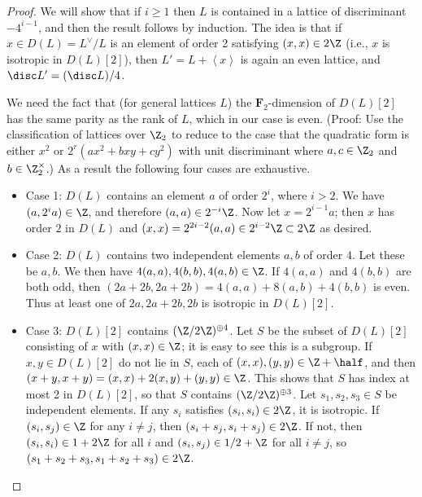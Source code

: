 \documentclass{article}
\def\F{\mathbf{F}}
\newcommand{\class}[1]{\left< #1 \right>}
\begin{document}
\begin{proof} We will show that if $i\geq 1$ then $L$ is contained in a lattice of discriminant $-4^{i-1}$, and then the result follows by induction. The idea is that if $x\in D(L)=L^\vee/L$ is an element of order 2 satisfying $(x,x)\in 2\Z$ (i.e., $x$ is isotropic in $D(L)[2]$), then $L'=L+\class{x}$ is again an even lattice, and $\disc L'=(\disc L)/4$. 

We need the fact that (for general lattices $L$) the $\F_2$-dimension of $D(L)[2]$ has the same parity as the rank of $L$, which in our case is even.  (Proof:  Use the classification of lattices over $\Z_2$ to reduce to the case that the quadratic form is either $x^2$ or $2^r(ax^2+bxy+cy^2)$ with unit discriminant where $a,c\in\Z_2$ and $b\in\Z_2^\times$.)   As a result the following four cases are exhaustive.

  \begin{itemize}
  \item{Case 1: $D(L)$ contains an element $a$ of order $2^i$, where $i>2$.}  We have $(a,2^i a)\in \Z$, and therefore $(a,a)\in 2^{-i}\Z$.  Now let $x=2^{i-1}a$;  then $x$ has order $2$ in $D(L)$ and $(x,x)=2^{2i-2}(a,a)\in 2^{i-2}\Z\subset 2\Z$ as desired.
  

  \item{Case 2: $D(L)$ contains two independent elements $a,b$ of
    order $4$.}  Let these be $a, b$.  We then have $4(a,a),4(b,b),4(a,b)\in \Z$.  
    If $4(a,a)$ and $4(b,b)$ are both odd, then
    $(2a+2b,2a+2b) = 4(a,a) + 8(a,b) + 4(b,b)$ is even.
    Thus at least one of $2a, 2a+2b, 2b$ is isotropic in $D(L)[2]$.
    
  \item{Case 3: $D(L)[2]$ contains $(\Z/2\Z)^{\oplus 4}$.}  Let $S$ be the subset of $D(L)[2]$
    consisting of $x$ with $(x,x) \in \Z$;  it is easy to see this is a subgroup.  If $x,y\in D(L)[2]$ do not lie in $S$, each of $(x,x),(y,y)\in \Z+\half$, and then $(x+y,x+y)=(x,x)+2(x,y)+(y,y)\in \Z$.  This shows that $S$ has index at most 2 in $D(L)[2]$, so that $S$ contains $(\Z/2\Z)^{\oplus 3}$.   Let $s_1, s_2, s_3\in S$ be independent elements.
    If any $s_i$ satisfies $(s_i,s_i) \in 2\Z$, it is isotropic.
    If $(s_i,s_j) \in \Z$ for any $i \ne j$, then $(s_i+s_j,s_i+s_j) \in 2\Z$.
    If not, then $(s_i,s_i) \in 1+2\Z$ for all $i$ and $(s_i,s_j) \in 1/2+\Z$
    for all $i \ne j$, so $(s_1+s_2+s_3,s_1+s_2+s_3) \in 2\Z$.  
  

\end{itemize}
\end{proof}
\end{document}
